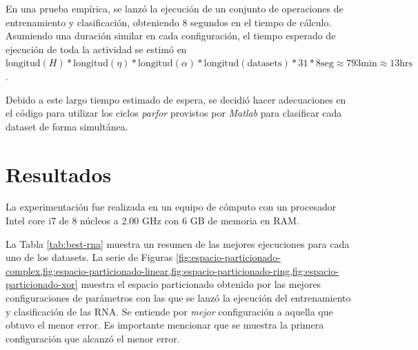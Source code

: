 \documentclass[journal]{IEEEtran}
\begin{document}
En una prueba empírica, se lanzó la ejecución de un conjunto de operaciones de entrenamiento y clasificación, obteniendo 8 segundos en el tiempo de cálculo.
Asumiendo una duración similar en cada configuración, el tiempo esperado de ejecución de toda la actividad se estimó en $\text{longitud}(H) * \text{longitud}(\eta) * \text{longitud}(\alpha) * \text{longitud}(\text{datasets}) * 31 * 8 \text{seg} \approx 793 \text{min} \approx 13 \text{hrs}$.

Debido a este largo tiempo estimado de espera, se decidió hacer adecuaciones en el código para utilizar los ciclos \emph{parfor} provistos por \emph{Matlab} para clasificar cada dataset de forma simultánea.


\section{Resultados} 
\label{sec:resultados}
La experimentación fue realizada en un equipo de cómputo con un procesador Intel core i7 de 8 núcleos a 2.00 GHz con 6 GB de memoria en RAM.

La Tabla \ref{tab:best-rna} muestra un resumen de las mejores ejecuciones para cada uno de los datasets.
La serie de Figuras \cref{fig:espacio-particionado-complex,fig:espacio-particionado-linear,fig:espacio-particionado-ring,fig:espacio-particionado-xor} muestra el espacio particionado obtenido por las mejores configuraciones de parámetros con las que se lanzó la ejecución del entrenamiento y clasificación de las RNA.
Se entiende por \emph{mejor} configuración a aquella que obtuvo el menor error.
Es importante mencionar que se muestra la primera configuración que alcanzó el menor error.
\end{document}
